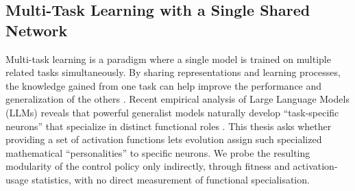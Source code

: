 \documentclass[12pt]{article}
\begin{document}
\subsection{Multi-Task Learning with a Single Shared Network}
\label{subsec:multi-task-learning-with-a-single}


Multi-task learning is a paradigm where a single model is trained on multiple related tasks simultaneously.
By sharing representations and learning processes, the knowledge gained from one task can help improve the performance and generalization of the others \parencite{zhang_survey_2021}.
Recent empirical analysis of Large Language Models (LLMs) reveals that powerful generalist models naturally develop ``task-specific neurons'' that specialize in distinct functional roles \parencite{leng_understanding_2025}.
This thesis asks whether providing a set of activation functions lets evolution assign such specialized mathematical ``personalities'' to specific neurons. We probe the resulting modularity of the control policy only indirectly, through fitness and activation-usage statistics, with no direct measurement of functional specialisation.
\end{document}
